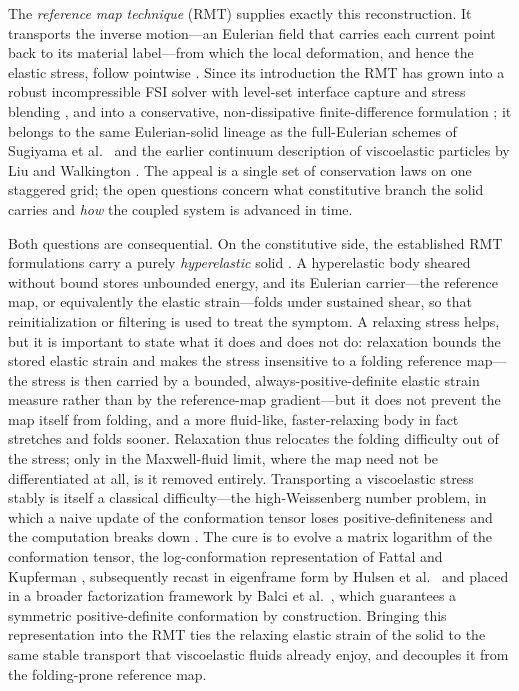\documentclass[final,3p,times]{elsarticle}
\theoremstyle{remark}
\begin{document}
The \emph{reference map technique} (RMT) supplies exactly this reconstruction. It
transports the inverse motion---an Eulerian field that carries each current point back to
its material label---from which the local deformation, and hence the elastic stress,
follow pointwise \cite{Kamrin2012,Valkov2015}. Since its introduction the RMT has grown into a robust
incompressible FSI solver with level-set interface capture and stress blending
\cite{Rycroft2020}, and into a conservative, non-dissipative finite-difference
formulation \cite{Jain2019}; it belongs to the same Eulerian-solid lineage as the
full-Eulerian schemes of Sugiyama et al.\ \cite{Sugiyama2011,Sugiyama2010} and
the earlier continuum description of viscoelastic particles by Liu and Walkington
\cite{Liu2001}. The appeal is a single set of conservation laws on one staggered
grid; the open questions concern what constitutive branch the solid carries and
\emph{how} the coupled system is advanced in time.

Both questions are consequential. On the constitutive side, the established RMT
formulations carry a purely \emph{hyperelastic} solid \cite{Kamrin2012,Rycroft2020,Jain2019}.
A hyperelastic body sheared without bound stores unbounded energy, and its Eulerian
carrier---the reference map, or equivalently the elastic strain---folds under sustained
shear, so that reinitialization or filtering is used to treat the symptom. A relaxing
stress helps, but it is important to state what it does and does not do: relaxation bounds
the stored elastic strain and makes the stress insensitive to a folding reference
map---the stress is then carried by a bounded, always-positive-definite elastic strain measure
rather than by the reference-map gradient---but it does not prevent the map itself from folding,
and a more fluid-like, faster-relaxing body in fact stretches and folds sooner. Relaxation thus
relocates the folding difficulty out of the stress; only in the Maxwell-fluid limit, where
the map need not be differentiated at all, is it removed entirely. Transporting a
viscoelastic stress stably is itself a classical difficulty---the high-Weissenberg
number problem, in which a naive update of the conformation tensor loses
positive-definiteness and the computation breaks down \cite{Oldroyd1950,Bird1987}.
The cure is to evolve a matrix logarithm of the conformation tensor, the
log-conformation representation of Fattal and Kupferman \cite{Fattal2004,Fattal2005},
subsequently recast in eigenframe form by Hulsen et al.\ \cite{Hulsen2005} and
placed in a broader factorization framework by Balci et al.\ \cite{Balci2011},
which guarantees a symmetric positive-definite conformation by construction. Bringing
this representation into the RMT ties the relaxing elastic strain of the solid to the
same stable transport that viscoelastic fluids already enjoy, and decouples it
from the folding-prone reference map.
\end{document}
